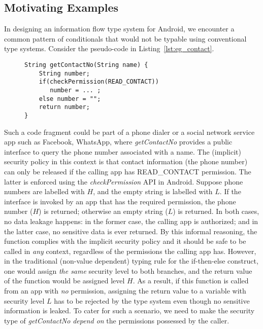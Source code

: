 \subsection{Motivating Examples}
In designing an information flow type system for Android, we encounter
a common pattern of conditionals that would not be typable using conventional type systems.
Consider the pseudo-code in Listing~\ref{lst:eg_contact}.
\begin{figure}[ht]
\begin{lstlisting}[caption={Sample code for getting contact info with a permission check.}, label={lst:eg_contact}]
String getContactNo(String name) {
    String number;
    if(checkPermission(READ_CONTACT))
       number = ... ;
    else number = "";
    return number;
}
\end{lstlisting}
\end{figure}
Such a code fragment could be part of a phone dialer or a social network service app such as Facebook, WhatsApp, where \textit{getContactNo} provides
a public interface to query the phone number associated with a name. The (implicit) security policy in this
context is that contact information (the phone number) can only be released if the calling app has
READ\_CONTACT permission.
The latter is enforced using the \textit{checkPermission} API in Android.
Suppose phone numbers are labelled with $H$, and the empty string is labelled with $L$.
If the interface is invoked by an app that has the required permission,
the phone number ($H$) is returned; otherwise an empty string ($L$)
is returned. In both cases, no data leakage happens: in the former case, the calling app is authorized; and in the latter case, no sensitive data is ever returned. By this informal reasoning, the function complies with the implicit security policy and it
should be safe to be called in \emph{any} context, regardless of the permissions the calling app has.
However, in the traditional (non-value dependent) typing rule for the if-then-else construct, one would assign \emph{the same} security level to both branches,
and the return value of the function would be assigned level $H$.
As a result, if this function is called from an app with \emph{no} permission, assigning the return value to a variable with security level $L$ has to be rejected by the type system even though no sensitive information is leaked.
To cater for such a scenario, we need to make the security type of \textit{getContactNo}
 \emph{depend on} the permissions possessed by the caller.

